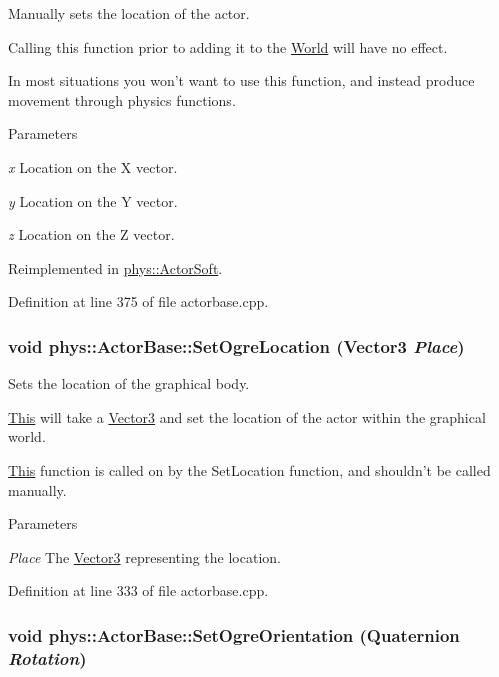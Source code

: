 Manually sets the location of the actor. 

Calling this function prior to adding it to the \hyperlink{classphys_1_1World}{World} will have no effect. \par
 In most situations you won't want to use this function, and instead produce movement through physics functions. 
\begin{DoxyParams}{Parameters}
\item[{\em x}]Location on the X vector. \item[{\em y}]Location on the Y vector. \item[{\em z}]Location on the Z vector. \end{DoxyParams}


Reimplemented in \hyperlink{classphys_1_1ActorSoft_a30ca5d4db06d9a81b5aff23faed4ee8d}{phys::ActorSoft}.



Definition at line 375 of file actorbase.cpp.

\hypertarget{classphys_1_1ActorBase_a192ced7c3191f3f9d4921aad73952046}{
\subsubsection[{SetOgreLocation}]{\setlength{\rightskip}{0pt plus 5cm}void phys::ActorBase::SetOgreLocation ({\bf Vector3} {\em Place})}}
\label{d8/d0f/classphys_1_1ActorBase_a192ced7c3191f3f9d4921aad73952046}


Sets the location of the graphical body. 

\hyperlink{structThis}{This} will take a \hyperlink{classphys_1_1Vector3}{Vector3} and set the location of the actor within the graphical world. \par
 \hyperlink{structThis}{This} function is called on by the SetLocation function, and shouldn't be called manually. 
\begin{DoxyParams}{Parameters}
\item[{\em Place}]The \hyperlink{classphys_1_1Vector3}{Vector3} representing the location. \end{DoxyParams}


Definition at line 333 of file actorbase.cpp.

\hypertarget{classphys_1_1ActorBase_a7b2d13cb1e8bba60eeae782a53fd5e49}{
\subsubsection[{SetOgreOrientation}]{\setlength{\rightskip}{0pt plus 5cm}void phys::ActorBase::SetOgreOrientation ({\bf Quaternion} {\em Rotation})}}
\label{d8/d0f/classphys_1_1ActorBase_a7b2d13cb1e8bba60eeae782a53fd5e49}


